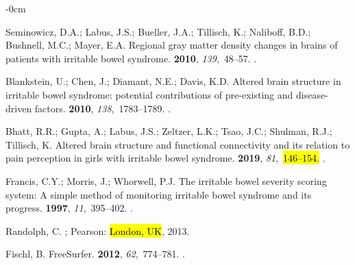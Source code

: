 \documentclass[diagnostics,article,accept,pdftex,moreauthors]{Definitions/mdpi}
\begin{document}
\begin{adjustwidth}{-\extralength}{0cm}
\begin{thebibliography}{999}
Seminowicz, D.A.; Labus, J.S.; Bueller, J.A.; Tillisch, K.; Naliboff, B.D.;
  Bushnell, M.C.; Mayer, E.A.
\newblock Regional gray matter density changes in brains of patients with
  irritable bowel syndrome.
 {\bf 2010}, {\em 139},~48--57.
.

Blankstein, U.; Chen, J.; Diamant, N.E.; Davis, K.D.
\newblock Altered brain structure in irritable bowel syndrome: potential
  contributions of pre-existing and disease-driven factors.
 {\bf 2010}, {\em 138},~1783--1789.
.

Bhatt, R.R.; Gupta, A.; Labus, J.S.; Zeltzer, L.K.; Tsao, J.C.; Shulman, R.J.;
  Tillisch, K.
\newblock Altered brain structure and functional connectivity and its relation
  to pain perception in girls with irritable bowel syndrome.
 {\bf 2019}, {\em 81},~\hl{146--154.} %
.


Francis, C.Y.; Morris, J.; Whorwell, P.J.
\newblock The irritable bowel severity scoring system: A simple method of
  monitoring irritable bowel syndrome and its progress.
 {\bf 1997}, {\em
  11},~395--402.
.

Randolph, C.
; Pearson: \hl{London, UK},  2013.

Fischl, B.
\newblock FreeSurfer.
 {\bf 2012}, {\em 62},~774--781.
.


\end{thebibliography}
\end{adjustwidth}
\end{document}
